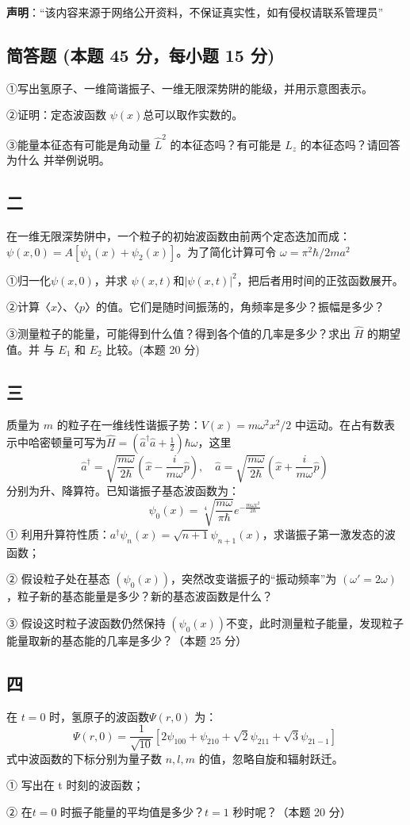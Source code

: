 
\textbf{声明}：“该内容来源于网络公开资料，不保证真实性，如有侵权请联系管理员”

\subsection{简答题 (本题 45 分，每小题 15 分)}
①写出氢原子、一维简谐振子、一维无限深势阱的能级，并用示意图表示。

②证明：定态波函数 $\psi(x)$总可以取作实数的。

③能量本征态有可能是角动量 $\hat{L}^2$ 的本征态吗？有可能是 $\hat{L}_z$ 的本征态吗？请回答为什么
并举例说明。

\subsection{二}
在一维无限深势阱中，一个粒子的初始波函数由前两个定态迭加而成：$\psi(x,0)=A[\psi_1 (x)
+\psi_2 (x)]$。为了简化计算可令 $\omega=\pi^2\hbar/2ma^2$

①归一化$\psi(x,0)$，并求 $\psi(x,t)$和$|\psi(x,t)|^2$，把后者用时间的正弦函数展开。

②计算〈$x$〉、〈$p$〉的值。它们是随时间振荡的，角频率是多少？振幅是多少？

③测量粒子的能量，可能得到什么值？得到各个值的几率是多少？求出 $\hat{H}$ 的期望值。并
与 $E_1$ 和 $E_2$ 比较。(本题 20 分)

\subsection{三}
质量为 $m$ 的粒子在一维线性谐振子势：$V(x)=m\omega^2x^2/2$ 中运动。在占有数表示中哈密顿量可写为$\hat{H} = \left(\hat{a}^\dagger \hat{a} + \frac{1}{2}\right)\hbar\omega$，这里 
$$\hat{a}^\dagger = \sqrt{\frac{m\omega}{2\hbar}} \left( \hat{x} - \frac{i}{m\omega} \hat{p} \right), \quad \hat{a} = \sqrt{\frac{m\omega}{2\hbar}} \left( \hat{x} + \frac{i}{m\omega} \hat{p} \right)~$$分别为升、降算符。已知谐振子基态波函数为：
$$\psi_0(x) = \sqrt[4]{\frac{m\omega}{\pi \hbar}} e^{-\frac{m\omega x^2}{2 \hbar}}~$$
① 利用升算符性质：$a^{\dagger} \psi_n(x) = \sqrt{n+1} \psi_{n+1}(x)$，求谐振子第一激发态的波函数；

② 假设粒子处在基态 $( \psi_0(x) )$，突然改变谐振子的“振动频率”为 $( \omega' = 2\omega )$，粒子新的基态能量是多少？新的基态波函数是什么？

③ 假设这时粒子波函数仍然保持 $( \psi_0(x) )$不变，此时测量粒子能量，发现粒子能量取新的基态能的几率是多少？（本题 25 分）

\subsection{四}
在 $t = 0 $ 时，氢原子的波函数$\Psi(r, 0)$ 为：$$\Psi(r, 0) = \frac{1}{\sqrt{10}} \left[ 2\psi_{100} + \psi_{210} + \sqrt{2}\psi_{211} + \sqrt{3}\psi_{21-1} \right]~$$
式中波函数的下标分别为量子数 $ n, l, m $ 的值，忽略自旋和辐射跃迁。

①  写出在 t 时刻的波函数；

② 在$ t = 0$ 时振子能量的平均值是多少？$t = 1$ 秒时呢？（本题 20 分）

